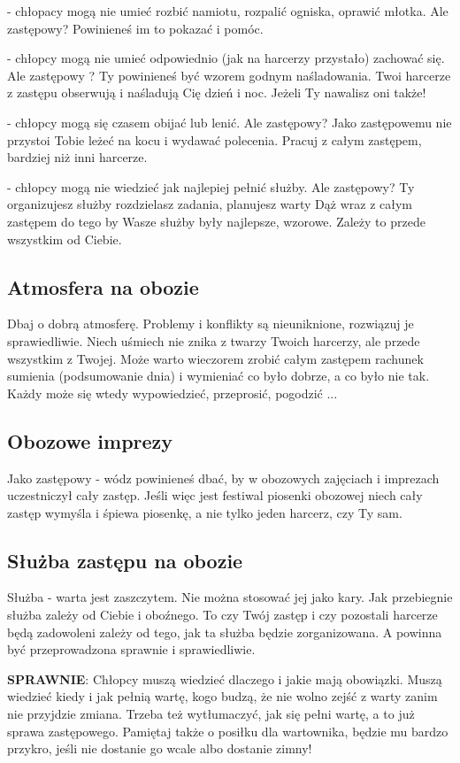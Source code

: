 - chłopacy mogą nie umieć rozbić namiotu, rozpalić ogniska, oprawić młotka. Ale zastępowy? Powinieneś im to  pokazać i pomóc.

- chłopcy mogą nie umieć odpowiednio (jak na harcerzy przystało) zachować się. Ale zastępowy ? Ty powinieneś być wzorem godnym naśladowania. Twoi harcerze z zastępu obserwują i naśladują Cię dzień i noc. Jeżeli Ty nawalisz oni także!

- chłopcy mogą się czasem obijać lub lenić. Ale zastępowy? Jako zastępowemu nie przystoi Tobie leżeć na kocu i wydawać  polecenia. Pracuj z całym zastępem, bardziej niż inni harcerze.

- chłopcy mogą nie wiedzieć jak najlepiej pełnić służby. Ale zastępowy? Ty organizujesz  służby rozdzielasz zadania, planujesz warty Dąż  wraz  z całym  zastępem do tego by Wasze służby były najlepsze, wzorowe. Zależy to przede  wszystkim  od  Ciebie.

\subsection{Atmosfera  na  obozie}
	Dbaj o dobrą atmosferę. Problemy i konflikty są nieuniknione, rozwiązuj  je  sprawiedliwie. Niech uśmiech nie znika z  twarzy Twoich harcerzy, ale przede wszystkim z Twojej. Może warto wieczorem zrobić całym zastępem rachunek  sumienia (podsumowanie dnia) i wymieniać co było dobrze, a co było nie tak. Każdy może się wtedy  wypowiedzieć, przeprosić, pogodzić ...

\subsection{Obozowe imprezy}
	Jako  zastępowy - wódz  powinieneś  dbać, by  w  obozowych  zajęciach  i  imprezach  uczestniczył  cały  zastęp. Jeśli więc jest festiwal piosenki obozowej niech cały zastęp wymyśla i śpiewa piosenkę, a nie tylko jeden harcerz, czy Ty sam.

\subsection{Służba zastępu na obozie}
	Służba - warta  jest  zaszczytem. Nie można stosować jej jako kary. Jak  przebiegnie  służba  zależy  od  Ciebie  i oboźnego. To czy Twój  zastęp i czy pozostali harcerze będą  zadowoleni zależy  od tego, jak  ta służba będzie zorganizowana. A powinna być przeprowadzona  sprawnie i sprawiedliwie.
	
\textbf{SPRAWNIE}: Chłopcy muszą wiedzieć dlaczego i jakie mają obowiązki. Muszą  wiedzieć kiedy i jak pełnią wartę, kogo budzą, że nie wolno zejść  z  warty zanim nie przyjdzie zmiana. Trzeba też wytłumaczyć, jak się pełni wartę, a to już sprawa zastępowego. Pamiętaj  także o posiłku dla  wartownika, będzie mu bardzo przykro, jeśli nie  dostanie go  wcale albo dostanie zimny!

